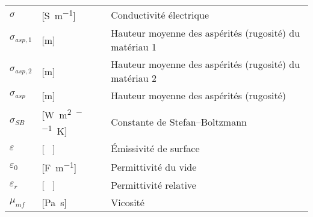 \begin{longtable}{l p{2.5cm} p{4in}}
	$\sigma$         & [\si{\siemens\per\metre}]                           & Conductivité électrique                                      \\
	$\sigma_{asp,1}$ & [\si{\metre}]                                       & Hauteur moyenne des aspérités (rugosité) du matériau 1       \\
	$\sigma_{asp,2}$ & [\si{\metre}]                                       & Hauteur moyenne des aspérités (rugosité) du matériau 2       \\
	$\sigma_{asp}$   & [\si{\metre}]                                       & Hauteur moyenne des aspérités (rugosité)                     \\
	$\sigma_{SB}$    & [\si{\watt\per\square\metre\per\raiseto{4}\kelvin}] & Constante de Stefan–Boltzmann                                \\
	$\varepsilon$    & [ \ ]                                               & Émissivité de surface                                        \\
	$\varepsilon_0$  & [\si{\farad\per\metre}]                             & Permittivité du vide                                         \\
	$\varepsilon_r$  & [ \ ]                                               & Permittivité relative                                        \\
	$\mu_{mf}$       & [\si{\pascal\second}]                               & Vicosité
\end{longtable}
